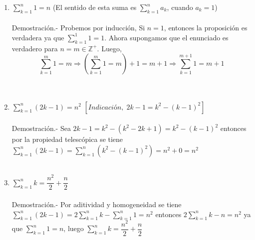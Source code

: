 \begin{enumerate}
\item $\displaystyle\sum_{k=1}^{n} 1 = n$ (El sentido de esta suma es $\displaystyle\sum_{k=1}^{n} a_k$, cuando $a_k=1$)\\\\
Demostración.- \; Probemos por inducción, Si $n=1$, entonces la proposición es verdadera ya que $\displaystyle\sum_{k=1}^{1} 1 = 1.$ Ahora supongamos que el enunciado es verdadero para $n=m \in \mathbb{Z}^+.$ Luego, $$\displaystyle\sum_{k=1}^m 1 = m \Rightarrow \left( \sum_{k=1}^m 1 = m \right) + 1 = m + 1 \Rightarrow \sum_{k=1}^{m+1} 1 = m+1$$\\\\

\item $\displaystyle\sum_{k=1}^{n} (2k - 1) = n^2$ $[Indicación, \; 2k-1 = k^2 - (k-1)^2]$\\\\
Demostración.- \; Sea $2k-1 = k^2 - (k^2 - 2k + 1) = k^2 - (k-1)^2$ entonces  por la propiedad telescópica se tiene $\sum\limits_{k=1}^n (2k-1)= \sum\limits_{k=1}^{n} (k^2 - (k-1)^2) = n^2 + 0 = n^2$\\\\

\item $\displaystyle\sum_{k=1}^{n} k = \dfrac{n^2}{2} + \dfrac{n}{2} $ \; \\\\
Demostración.- \;Por aditividad y homogeneidad se tiene $\sum\limits_{k=1}^{n}(2k-1) = 2\sum\limits_{k=1}^{n} k - \sum\limits_{k=1}^{n} 1 = n^2$ entonces $ 2 \sum\limits_{k=1}^{n} k - n =n^2$ ya que $\sum\limits_{k=1}^{n} 1 = n$, luego $\sum\limits_{k=1}^{n} k = \dfrac{n^2}{2} + \dfrac{n}{2}$\\\\


\end{enumerate}
